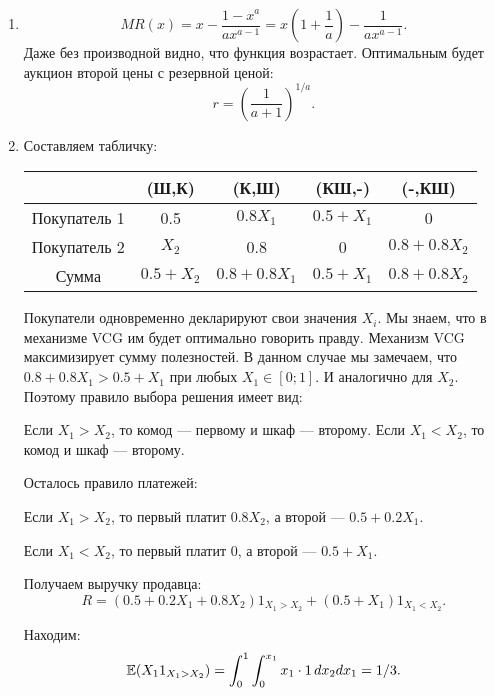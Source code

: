 \begin{enumerate}

\item
\begin{equation}
MR(x)=x-\frac{1-x^{a}}{ax^{a-1}}=x\left(1+\frac{1}{a}\right)-\frac{1}{ax^{a-1}}.
\end{equation}
Даже без производной видно, что функция возрастает. Оптимальным будет аукцион второй цены с резервной ценой: 
\begin{equation}
r=\left(\frac{1}{a+1}\right)^{1/a}.
\end{equation}

\item Составляем табличку:

\begin{tabular}{c|cccc}
& (Ш,К) & (К,Ш) & (КШ,-) & (-,КШ) \\
\hline
Покупатель 1 & 0.5 & $ 0.8X_{1} $ & $ 0.5+X_{1} $ & 0 \\
Покупатель 2 & $ X_{2} $ & 0.8 & 0 & $ 0.8+0.8X_{2} $ \\
Сумма & $ 0.5+X_{2} $& $ 0.8+0.8X_{1} $ & $ 0.5+X_{1} $ & $ 0.8+0.8X_{2} $ \\
\end{tabular}

Покупатели одновременно декларируют свои значения $ X_{i} $. Мы знаем, что в механизме VCG им будет оптимально говорить правду. Механизм VCG максимизирует сумму полезностей. В данном случае мы замечаем, что $ 0.8+0.8X_{1}>0.5+X_{1} $ при любых $ X_{1} \in [0;1]$. И аналогично для $ X_{2} $. Поэтому правило выбора решения имеет вид:

Если $ X_{1}>X_{2} $, то комод — первому и шкаф — второму. Если $ X_{1}<X_{2} $, то комод и шкаф — второму.

Осталось правило платежей:

Если $ X_{1}>X_{2} $, то первый платит $ 0.8X_{2} $, а второй — $ 0.5+0.2X_{1} $.

Если $ X_{1}<X_{2} $, то первый платит 0, а второй — $ 0.5+X_{1} $.

Получаем выручку продавца:
\begin{equation}
R=(0.5+0.2X_{1}+0.8X_{2})1_{X_{1}>X_{2}}+(0.5+X_{1})1_{X_{1}<X_{2}}.
\end{equation}

Находим:
\begin{equation}
\operatorname{\mathbb{E}}(X_{1}1_{X_{1}>X_{2}})=\int_{0}^{1}\int_{0}^{x_{1}}x_{1} \cdot 1 \, dx_{2}dx_{1}=1/3.
\end{equation}


\end{enumerate}
